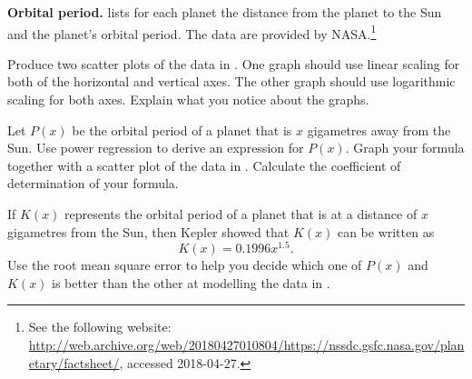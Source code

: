 \documentclass[a4paper,oneside,12pt]{article}
\begin{document}
\begin{exercise}
\textbf{Orbital period.}
 lists for each planet the
distance from the planet to the Sun and the planet's orbital period.
The data are provided by NASA.\footnote{
  See the following website:
  \url{http://web.archive.org/web/20180427010804/https://nssdc.gsfc.nasa.gov/planetary/factsheet/},
  accessed 2018-04-27.
}
\begin{packedenum}
\item\label{subex:logarithm:planets_scatter_plots}
  Produce two scatter plots of the data in
  .  One graph should use linear
  scaling for both of the horizontal and vertical axes.  The other
  graph should use logarithmic scaling for both axes.  Explain what
  you notice about the graphs.

\item\label{subex:logarithm:planets_power_regression}
  Let $P(x)$ be the orbital period of a planet that is $x$ gigametres
  away from the Sun.  Use power regression to derive an expression for
  $P(x)$.  Graph your formula together with a scatter plot of the data
  in .  Calculate the coefficient
  of determination of your formula.

\item\label{subex:logarithm:planets_Kepler}
  If $K(x)$ represents the orbital period of a planet that is at a
  distance of $x$ gigametres from the Sun, then Kepler showed that
  $K(x)$ can be written as
  \begin{equation}
  \label{eqn:logarithm:planets_Kepler_formula}
  K(x)
  =
  0.1996 x^{1.5}.
  \end{equation}
  Use the root mean square error to help you decide which one of
  $P(x)$ and $K(x)$ is better than the other at modelling the data in
  .
\end{packedenum}
\end{exercise}
\end{document}
